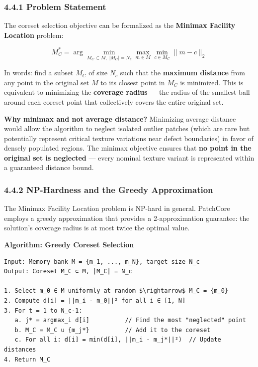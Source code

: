 \documentclass[12pt, a4paper, oneside]{report}
\begin{document}
\subsubsection{4.4.1 Problem Statement}\label{problem-statement}

The coreset selection objective can be formalized as the \textbf{Minimax Facility Location} problem:

\[M_C^* = \arg\min_{M_C \subset M, \; |M_C| = N_c} \max_{m \in M} \min_{c \in M_C} \|m - c\|_2\]

In words: find a subset \(M_C\) of size \(N_c\) such that the \textbf{maximum distance} from any point in the original set \(M\) to its closest point in \(M_C\) is minimized. This is equivalent to minimizing the \textbf{coverage radius} --- the radius of the smallest ball around each coreset point that collectively covers the entire original set.

\textbf{Why minimax and not average distance?} Minimizing average distance would allow the algorithm to neglect isolated outlier patches (which are rare but potentially represent critical texture variations near defect boundaries) in favor of densely populated regions. The minimax objective ensures that \textbf{no point in the original set is neglected} --- every nominal texture variant is represented within a guaranteed distance bound.

\subsubsection{4.4.2 NP-Hardness and the Greedy Approximation}\label{np-hardness-and-the-greedy-approximation}

The Minimax Facility Location problem is NP-hard in general. PatchCore employs a greedy approximation that provides a 2-approximation guarantee: the solution's coverage radius is at most twice the optimal value.

\textbf{Algorithm: Greedy Coreset Selection}

\begin{lstlisting}
Input: Memory bank M = {m_1, ..., m_N}, target size N_c
Output: Coreset M_C ⊂ M, |M_C| = N_c

1. Select m_0 ∈ M uniformly at random $\rightarrow$ M_C = {m_0}
2. Compute d[i] = ||m_i - m_0||² for all i ∈ [1, N]
3. For t = 1 to N_c-1:
   a. j* = argmax_i d[i]          // Find the most "neglected" point
   b. M_C = M_C ∪ {m_j*}          // Add it to the coreset
   c. For all i: d[i] = min(d[i], ||m_i - m_j*||²)  // Update distances
4. Return M_C
\end{lstlisting}
\end{document}
